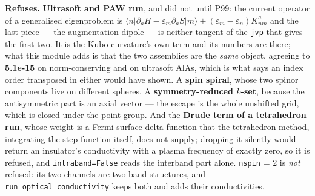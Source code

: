 \documentclass[11pt,a4paper]{article}
\newcommand{\code}[1]{\texttt{\small #1}}
\begin{document}
\begin{refuses}
\textbf{Refuses.} \textbf{Ultrasoft and PAW run}, and did not until P99: the
current operator of a generalised eigenproblem is $\langle n|\partial_a H -
\varepsilon_m \partial_a S|m\rangle + (\varepsilon_m-\varepsilon_n)K^a_{nm}$
and the last piece --- the augmentation dipole --- is neither tangent of the
\code{jvp} that gives the first two. It is the Kubo curvature's own term and
its numbers are there; what this module adds is that the two assemblies are the
\emph{same} object, agreeing to \textbf{5.1e-15} on norm-conserving and on
ultrasoft AlAs, which is what says an index order transposed in either would
have shown. A \textbf{spin spiral}, whose two spinor
components live on different spheres. A \textbf{symmetry-reduced $k$-set},
because the antisymmetric part is an axial vector --- the escape is the whole
unshifted grid, which is closed under the point group. And the
\textbf{Drude term of a tetrahedron run}, whose weight is a Fermi-surface delta
function that the tetrahedron method, integrating the step function itself,
does not supply; dropping it silently would return an insulator's conductivity
with a plasma frequency of exactly zero, so it is refused, and
\code{intraband=False} reads the interband part alone. \code{nspin} = 2 is
\emph{not} refused: its two channels are two band structures, and
\code{run\_optical\_conductivity} keeps both and adds their conductivities.


\end{refuses}
\end{document}
